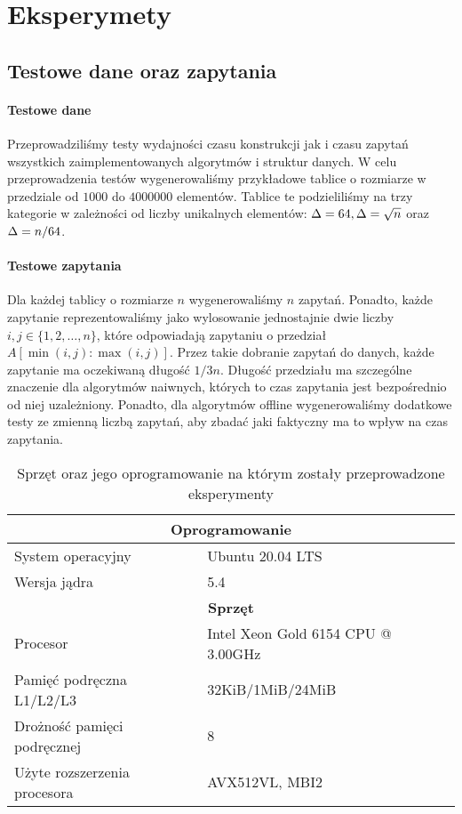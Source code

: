 \section{Eksperymety}
\label{sec:exp}
\subsection{Testowe dane oraz zapytania}
\paragraph{Testowe dane}
Przeprowadziliśmy testy wydajności czasu konstrukcji jak i czasu zapytań wszystkich zaimplementowanych algorytmów i struktur danych. W celu przeprowadzenia testów wygenerowaliśmy przykładowe tablice o rozmiarze w przedziale od $1000$ do $4000000$ elementów. Tablice te podzieliliśmy na trzy kategorie w zależności od liczby unikalnych elementów: $\Delta = 64, \Delta=\sqrt{n}$ oraz $\Delta = n/64$.
\paragraph{Testowe zapytania} Dla każdej tablicy o rozmiarze $n$ wygenerowaliśmy $n$ zapytań. Ponadto, każde zapytanie reprezentowaliśmy jako wylosowanie jednostajnie dwie liczby $i, j \in \{1,2,\dots,n\}$, które odpowiadają zapytaniu o przedział $A[\min(i, j) : \max(i, j)]$. Przez takie dobranie zapytań do danych, każde zapytanie ma oczekiwaną długość $1/3n$. Długość przedziału ma szczególne znaczenie dla algorytmów naiwnych, których to czas zapytania jest bezpośrednio od niej uzależniony. Ponadto, dla algorytmów offline wygenerowaliśmy dodatkowe testy ze zmienną liczbą zapytań, aby zbadać jaki faktyczny ma to wpływ na czas zapytania.
\begin{table}[]
    \centering
    \begin{tabular}{|l|l|}
        \hline
      \multicolumn{2}{|c|}{\textbf{Oprogramowanie}} \tabularnewline
      \hline 
      System operacyjny & Ubuntu 20.04 LTS \tabularnewline
      \hline 
     Wersja jądra & 5.4\tabularnewline
      \hline
      \multicolumn{2}{|c|}{\textbf{Sprzęt}} \tabularnewline
      \hline 
      Procesor & Intel Xeon Gold 6154 CPU @ 3.00GHz\tabularnewline
      \hline
     Pamięć podręczna L1/L2/L3 & 32KiB/1MiB/24MiB\tabularnewline
      \hline
      Drożność pamięci podręcznej & 8\tabularnewline
      \hline
      \hline
      Użyte rozszerzenia procesora & AVX512VL, MBI2 \tabularnewline
      \hline
    \end{tabular}
    \caption{Sprzęt oraz jego oprogramowanie na którym zostały przeprowadzone eksperymenty}
    \label{tab:my_label}
\end{table}

